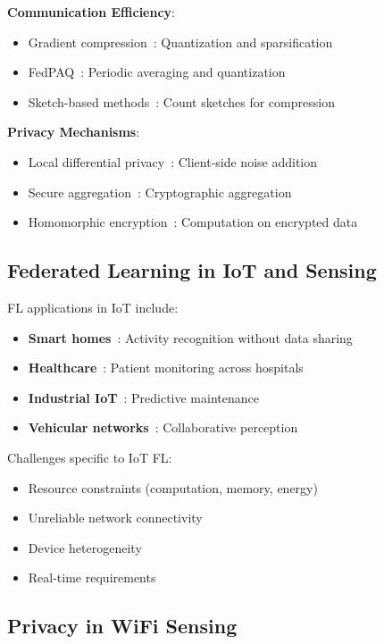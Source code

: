 \documentclass[journal]{IEEEtran}
\begin{document}
\textbf{Communication Efficiency}:
\begin{itemize}
\item Gradient compression~\cite{alistarh2017qsgd}: Quantization and sparsification
\item FedPAQ~\cite{reisizadeh2020fedpaq}: Periodic averaging and quantization
\item Sketch-based methods~\cite{rothchild2020fetchsgd}: Count sketches for compression
\end{itemize}

\textbf{Privacy Mechanisms}:
\begin{itemize}
\item Local differential privacy~\cite{dwork2014algorithmic}: Client-side noise addition
\item Secure aggregation~\cite{bonawitz2017practical}: Cryptographic aggregation
\item Homomorphic encryption~\cite{aono2017privacy}: Computation on encrypted data
\end{itemize}

\subsection{Federated Learning in IoT and Sensing}

FL applications in IoT include:
\begin{itemize}
\item \textbf{Smart homes}~\cite{yang2021federated}: Activity recognition without data sharing
\item \textbf{Healthcare}~\cite{brisimi2018federated}: Patient monitoring across hospitals
\item \textbf{Industrial IoT}~\cite{savazzi2021federated}: Predictive maintenance
\item \textbf{Vehicular networks}~\cite{samarakoon2019federated}: Collaborative perception
\end{itemize}

Challenges specific to IoT FL:
\begin{itemize}
\item Resource constraints (computation, memory, energy)
\item Unreliable network connectivity
\item Device heterogeneity
\item Real-time requirements
\end{itemize}

\subsection{Privacy in WiFi Sensing}
\end{document}
